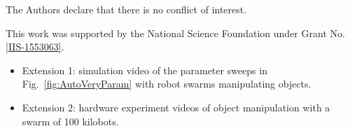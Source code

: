 \documentclass[Afour,sageh,times]{sagej} %
\begin{document}

\maketitle


%











\begin{dci}
The Authors declare that there is no conflict of interest.
\end{dci}
\begin{funding}
This work was supported by the National Science Foundation under Grant No.\ 
\href{http://nsf.gov/awardsearch/showAward?AWD_ID=1553063}{ [IIS-1553063]}.
\end{funding}
\newpage
\begin{sm}
\begin{itemize}
\item Extension 1:  simulation video of the parameter sweeps in Fig.~\ref{fig:AutoVeryParam} with robot swarms manipulating objects.
\item Extension 2: hardware experiment videos of object manipulation with a swarm of 100 kilobots.
\end{itemize}
\end{sm}

   
%
   
%


\end{document}
